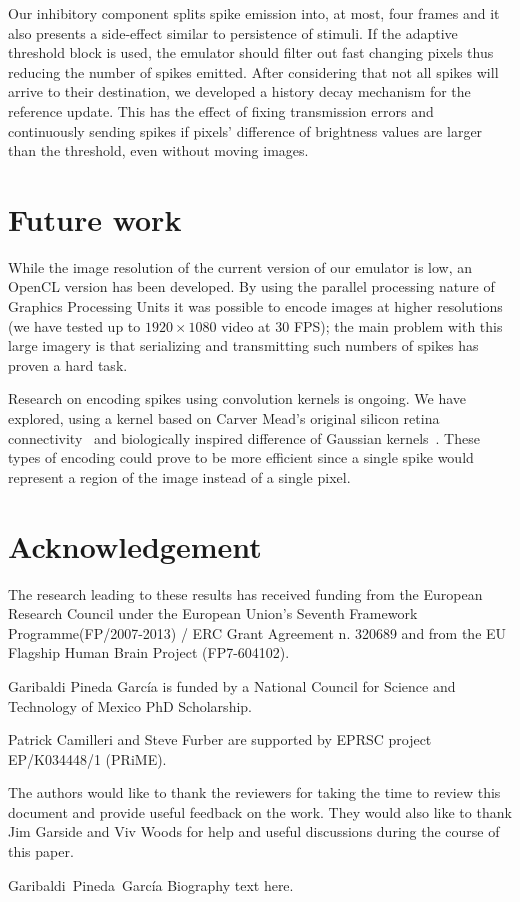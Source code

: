 \documentclass[conference]{IEEEtran}
\begin{document}
Our inhibitory component splits spike emission into, at most, four frames and it also presents a side-effect similar to persistence of stimuli. If the adaptive threshold block is used, the emulator should filter out fast changing pixels thus reducing the number of spikes emitted. After considering that not all spikes will arrive to their destination, we developed a history decay mechanism for the reference update. This has the effect of fixing transmission errors and continuously sending spikes if pixels' difference of brightness values are larger than the threshold, even without moving images.

\section{Future work}
\label{sec:future-work}
While the image resolution of the current version of our emulator is low, an OpenCL version has been developed. By using the parallel processing nature of Graphics Processing Units it was possible to encode images at higher resolutions (we have tested up to $1920\times1080$ video at 30 FPS); the main problem with this large imagery is that serializing and transmitting such numbers of spikes has proven a hard task.

Research on encoding spikes using convolution kernels is ongoing. We have explored, using a kernel based on Carver Mead's original silicon retina connectivity~\cite{Mead1989} and biologically inspired difference of Gaussian kernels~\cite{basab}. These types of encoding could prove to be more efficient since a single spike would represent a region of the image instead of a single pixel.
\section*{Acknowledgement}
The research leading to these results has received funding from the European Research Council under the European Union's Seventh Framework Programme(FP/2007-2013) / ERC Grant Agreement n. 320689 and from the EU Flagship Human Brain Project (FP7-604102).

Garibaldi Pineda García is funded by a National Council for Science and Technology of Mexico PhD Scholarship.

Patrick Camilleri and Steve Furber are supported by EPRSC project EP/K034448/1 (PRiME). 

The authors would like to thank the reviewers for taking the time to review this document and provide useful feedback on the work. They would also like to thank Jim Garside and Viv Woods for help and useful discussions during the course of this paper.






\begin{IEEEbiography}{Garibaldi~Pineda~García}
  Biography text here.
\end{IEEEbiography}
\end{document}
